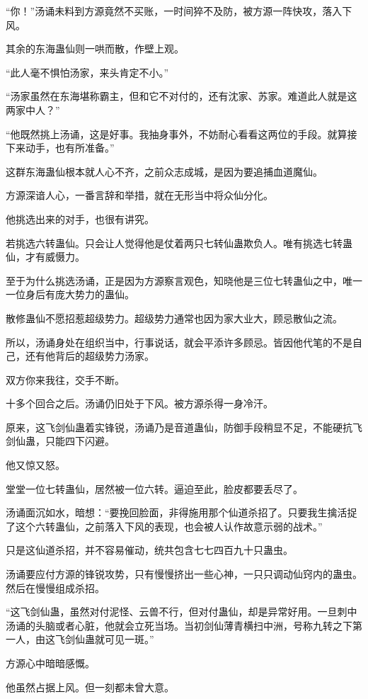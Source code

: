 \begin{this_body}
“你！”汤诵未料到方源竟然不买账，一时间猝不及防，被方源一阵快攻，落入下风。

其余的东海蛊仙则一哄而散，作壁上观。

“此人毫不惧怕汤家，来头肯定不小。”

“汤家虽然在东海堪称霸主，但和它不对付的，还有沈家、苏家。难道此人就是这两家中人？”

“他既然挑上汤诵，这是好事。我抽身事外，不妨耐心看看这两位的手段。就算接下来动手，也有所准备。”

这群东海蛊仙根本就人心不齐，之前众志成城，是因为要追捕血道魔仙。

方源深谙人心，一番言辞和举措，就在无形当中将众仙分化。

他挑选出来的对手，也很有讲究。

若挑选六转蛊仙。只会让人觉得他是仗着两只七转仙蛊欺负人。唯有挑选七转蛊仙，才有威慑力。

至于为什么挑选汤诵，正是因为方源察言观色，知晓他是三位七转蛊仙之中，唯一一位身后有庞大势力的蛊仙。

散修蛊仙不愿招惹超级势力。超级势力通常也因为家大业大，顾忌散仙之流。

所以，汤诵身处在组织当中，行事说话，就会平添许多顾忌。皆因他代笔的不是自己，还有他背后的超级势力汤家。

双方你来我往，交手不断。

十多个回合之后。汤诵仍旧处于下风。被方源杀得一身冷汗。

原来，这飞剑仙蛊着实锋锐，汤诵乃是音道蛊仙，防御手段稍显不足，不能硬抗飞剑仙蛊，只能四下闪避。

他又惊又怒。

堂堂一位七转蛊仙，居然被一位六转。逼迫至此，脸皮都要丢尽了。

汤诵面沉如水，暗想：“要挽回脸面，非得施用那个仙道杀招了。只要我生擒活捉了这个六转蛊仙，之前落入下风的表现，也会被人认作故意示弱的战术。”

只是这仙道杀招，并不容易催动，统共包含七七四百九十只蛊虫。

汤诵要应付方源的锋锐攻势，只有慢慢挤出一些心神，一只只调动仙窍内的蛊虫。然后在慢慢组成杀招。

“这飞剑仙蛊，虽然对付泥怪、云兽不行，但对付蛊仙，却是异常好用。一旦刺中汤诵的头脑或者心脏，他就会立死当场。当初剑仙薄青横扫中洲，号称九转之下第一人，由这飞剑仙蛊就可见一斑。”

方源心中暗暗感慨。

他虽然占据上风。但一刻都未曾大意。


\end{this_body}
